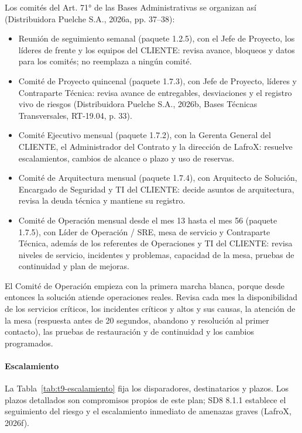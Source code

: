 \documentclass[carta,firma,final]{lafrox}
\begin{document}
Los comités del Art. 71° de las Bases Administrativas se organizan así (Distribuidora Puelche S.A., 2026a, pp. 37--38):
\begin{itemize}
    \item Reunión de seguimiento semanal (paquete 1.2.5), con el Jefe de Proyecto, los líderes de frente y los equipos del CLIENTE: revisa avance, bloqueos y datos para los comités; no reemplaza a ningún comité.
    \item Comité de Proyecto quincenal (paquete 1.7.3), con Jefe de Proyecto, líderes y Contraparte Técnica: revisa avance de entregables, desviaciones y el registro vivo de riesgos (Distribuidora Puelche S.A., 2026b, Bases Técnicas Transversales, RT-19.04, p. 33).
    \item Comité Ejecutivo mensual (paquete 1.7.2), con la Gerenta General del CLIENTE, el Administrador del Contrato y la dirección de LafroX: resuelve escalamientos, cambios de alcance o plazo y uso de reservas.
    \item Comité de Arquitectura mensual (paquete 1.7.4), con Arquitecto de Solución, Encargado de Seguridad y TI del CLIENTE: decide asuntos de arquitectura, revisa la deuda técnica y mantiene su registro.
    \item Comité de Operación mensual desde el mes 13 hasta el mes 56 (paquete 1.7.5), con Líder de Operación / SRE, mesa de servicio y Contraparte Técnica, además de los referentes de Operaciones y TI del CLIENTE: revisa niveles de servicio, incidentes y problemas, capacidad de la mesa, pruebas de continuidad y plan de mejoras.
\end{itemize}

El Comité de Operación empieza con la primera marcha blanca, porque desde entonces la solución atiende operaciones reales. Revisa cada mes la disponibilidad de los servicios críticos, los incidentes críticos y altos y sus causas, la atención de la mesa (respuesta antes de 20 segundos, abandono y resolución al primer contacto), las pruebas de restauración y de continuidad y los cambios programados.

\paragraph{Escalamiento}
La Tabla~\ref{tab:t9-escalamiento} fija los disparadores, destinatarios y plazos. Los plazos detallados son compromisos propios de este plan; SD8 8.1.1 establece el seguimiento del riesgo y el escalamiento inmediato de amenazas graves (LafroX, 2026f).
\end{document}
